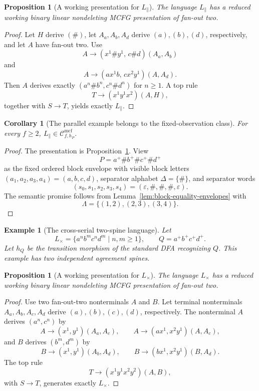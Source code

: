 \documentclass[11pt,a4paper]{article}
\newtheorem{proposition}[theorem]{Proposition}
\newtheorem{corollary}[theorem]{Corollary}
\newtheorem{example}[theorem]{Example}
\theoremstyle{remark}
\newcommand{\Cmcf}[2]{\mathcal{C}^{\mathrm{mcf}}_{#1,#2}}
\newcommand{\eps}{\varepsilon}
\begin{document}
\begin{proposition}[A working presentation for \(L_{\parallel}\)]
\label{prop:parallel-running-example}
The language \(L_{\parallel}\) has a reduced working binary linear nondeleting
MCFG presentation of fan-out two.
\end{proposition}

\begin{proof}
Let \(H\) derive \((\#)\), let \(A_a,A_b,A_d\) derive \((a),(b),(d)\),
respectively, and let \(A\) have fan-out two.  Use
\[
  A\to(x^1\#y^1,\,c\#d)(A_a,A_b)
\]
and
\[
  A\to(a x^1 b,\,c x^2 y^1)(A,A_d).
\]
Then \(A\) derives exactly \((a^n\#b^n,c^n\#d^n)\) for \(n\ge1\).  A top rule
\[
  T\to(x^1y^1x^2)(A,H),
\]
together with \(S\to T\), yields exactly \(L_{\parallel}\).
\end{proof}

\begin{corollary}[The parallel example belongs to the fixed-observation class]
\label{cor:parallel-in-fixed-observation-class}
For every \(f\ge2\), \(L_{\parallel}\in\Cmcf{f}{h_P}\).
\end{corollary}

\begin{proof}
The presentation is Proposition~\ref{prop:parallel-running-example}.  View
\[
  P=a^+\#b^+\#c^+\#d^+
\]
as the fixed ordered block envelope with visible block letters
\((a_1,a_2,a_3,a_4)=(a,b,c,d)\), separator alphabet
\(\Delta=\{\#\}\), and separator words
\[
  (s_0,s_1,s_2,s_3,s_4)=(\eps,\#,\#,\#,\eps).
\]
The semantic promise follows from
Lemma~\ref{lem:block-equality-envelopes} with
\[
  \Lambda=\{(1,2),(2,3),(3,4)\}.
\]
\end{proof}

\begin{example}[The cross-serial two-spine language]
\label{ex:cross-serial-language}
Let
\[
  L_{\times}=\{a^n b^m c^n d^m\mid n,m\ge1\},
  \qquad Q=a^+b^+c^+d^+ .
\]
Let \(h_Q\) be the transition morphism of the standard DFA recognizing \(Q\).
This example has two independent agreement spines.
\end{example}

\begin{proposition}[A working presentation for \(L_{\times}\)]
\label{prop:cross-serial-running-example}
The language \(L_{\times}\) has a reduced working binary linear nondeleting MCFG
presentation of fan-out two.
\end{proposition}

\begin{proof}
Use two fan-out-two nonterminals \(A\) and \(B\).  Let terminal nonterminals
\(A_a,A_b,A_c,A_d\) derive \((a),(b),(c),(d)\), respectively.  The nonterminal
\(A\) derives \((a^n,c^n)\) by
\[
  A\to(x^1,y^1)(A_a,A_c),
  \qquad
  A\to(a x^1,x^2 y^1)(A,A_c),
\]
and \(B\) derives \((b^m,d^m)\) by
\[
  B\to(x^1,y^1)(A_b,A_d),
  \qquad
  B\to(b x^1,x^2 y^1)(B,A_d).
\]
The top rule
\[
  T\to(x^1y^1x^2y^2)(A,B),
\]
with \(S\to T\), generates exactly \(L_{\times}\).
\end{proof}
\end{document}
